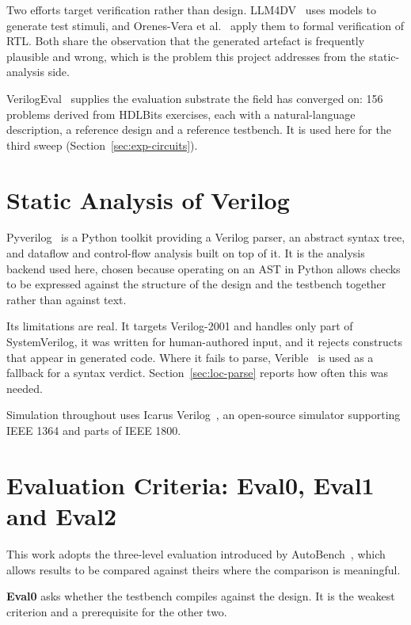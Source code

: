 \documentclass[11pt,a4paper,titlepage=false]{scrreprt}
\begin{document}
Two efforts target verification rather than design. LLM4DV~\cite{zhang2023llm4dv} uses
models to generate test stimuli, and Orenes-Vera et
al.~\cite{orenes2023llmformal} apply them to formal verification of RTL. Both share the
observation that the generated artefact is frequently plausible and wrong, which is the
problem this project addresses from the static-analysis side.

VerilogEval~\cite{liu2023verilogeval} supplies the evaluation substrate the field has
converged on: 156 problems derived from HDLBits exercises, each with a natural-language
description, a reference design and a reference testbench. It is used here for the third
sweep (Section~\ref{sec:exp-circuits}).

\section{Static Analysis of Verilog}\label{sec:bg-static}

Pyverilog~\cite{takamaeda2015pyverilog} is a Python toolkit providing a Verilog parser, an
abstract syntax tree, and dataflow and control-flow analysis built on top of it. It is the
analysis backend used here, chosen because operating on an AST in Python allows checks to be
expressed against the structure of the design and the testbench together rather than against
text.

Its limitations are real. It targets Verilog-2001 and handles only part of SystemVerilog, it
was written for human-authored input, and it rejects constructs that appear in generated
code. Where it fails to parse, Verible~\cite{verible} is used as a fallback for a syntax
verdict. Section~\ref{sec:loc-parse} reports how often this was needed.

Simulation throughout uses Icarus Verilog~\cite{iverilog}, an open-source simulator
supporting IEEE 1364 and parts of IEEE 1800.

\section{Evaluation Criteria: Eval0, Eval1 and Eval2}\label{sec:bg-eval}

This work adopts the three-level evaluation introduced by
AutoBench~\cite{qiu2024autobench}, which allows results to be compared against theirs where
the comparison is meaningful.

\textbf{Eval0} asks whether the testbench compiles against the design. It is the weakest
criterion and a prerequisite for the other two.
\end{document}
